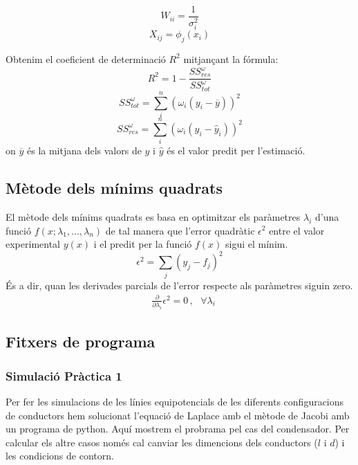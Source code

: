 \documentclass[11pt]{article}
\numberwithin{equation}{section}
\numberwithin{figure}{section}
\numberwithin{table}{section}
\begin{document}
 \begin{equation}
     W_{ii} = \frac{1}{\sigma_i^2}
 \end{equation}
 \begin{equation}
     X_{ij} = \phi_j(x_i)
 \end{equation}

Obtenim el coeficient de determinació $R^2$ mitjançant la fórmula:
\begin{equation}
    R^2 = 1 - \frac{SS_{res}^\omega}{SS_{tot}^\omega}
\end{equation}
\begin{equation}
    SS_{tot}^\omega = \sum^n_{i}(\omega_i(y_i-\overline{y}))^2
\end{equation}
\begin{equation}
    SS_{res}^\omega = \sum^n_{i}(\omega_i(y_i-\hat{y}_i))^2
\end{equation}
on $\overline{y}$ és la mitjana dels valors de $y$ i $\hat{y}$ és el valor predit per l'estimació.

\subsection{Mètode dels mínims quadrats} \label{sec: mínims_quadrats}

El mètode dels mínims quadrats es basa en optimitzar els paràmetres $\lambda_i$ d'una funció $f(x;\lambda_1,...,\lambda_n)$ de tal manera que l'error quadràtic $\epsilon^2$ entre el valor experimental $y(x)$ i el predit per la funció $f(x)$ sigui el mínim.
\begin{equation}
    \epsilon^2 = \sum_j(y_j-f_j)^2
\end{equation}
És a dir, quan les derivades parcials de l'error respecte als paràmetres siguin zero.
\begin{align}
     & \frac{\partial}{\partial\lambda_i}\epsilon^2 = 0 \, , \,\,\,\, \forall \lambda_i
\end{align}

\subsection{Fitxers de programa}
\subsubsection{Simulació Pràctica 1}\label{sec: python}
Per fer les simulacions de les línies equipotencials de les diferents configuracions de conductors hem solucionat l'equació de Laplace amb el mètode de Jacobi amb un programa de python. Aquí mostrem el probrama pel cas del condensador. Per calcular els altre casos només cal canviar les dimencions dels conductors ($l$ i $d$) i les condicions de contorn.
\end{document}
